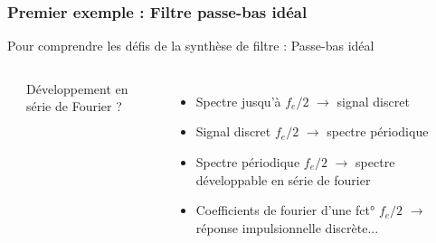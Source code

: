 \documentclass{beamer}
\begin{document}
\begin{frame}
\frametitle{Premier exemple :  Filtre passe-bas idéal}

\vspace{0.3cm}
Pour comprendre les défis de la synthèse de filtre : Passe-bas idéal\\
\vspace{0.3cm}
\begin{columns}

\column{60mm}
\begin{center}
\end{center}

\column{60mm}
Développement en série de Fourier ? \\
\vspace{0.1cm}
\begin{itemize}
\item<2-> Spectre jusqu'à $f_e/2$ $\rightarrow$ signal discret
\vspace{0.1cm}
\item<3-> Signal discret  $f_e/2$ $\rightarrow$ spectre périodique
\vspace{0.1cm}
\item<4-> Spectre périodique  $f_e/2$ $\rightarrow$ spectre développable en série de fourier 
\vspace{0.1cm}
\item<5-> Coefficients de fourier d'une fct°  $f_e/2$ $\rightarrow$ réponse impulsionnelle discrète...
\end{itemize}

\end{columns}

\end{frame}
\end{document}
